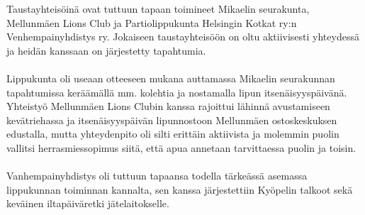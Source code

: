 \documentclass[a4paper, 12pt, finnish]{report} %
\begin{document}
Taustayhteisöinä ovat tuttuun tapaan toimineet Mikaelin seurakunta, Mellunmäen Lions Club ja Partiolippukunta Helsingin Kotkat ry:n Venhempainyhdistys ry. Jokaiseen taustayhteisöön on oltu aktiivisesti yhteydessä ja heidän kanssaan on järjestetty tapahtumia.\\
\\Lippukunta oli useaan otteeseen mukana auttamassa Mikaelin seurakunnan tapahtumissa keräämällä mm. kolehtia ja nostamalla lipun itsenäisyyspäivänä. Yhteistyö Mellunmäen Lions Clubin kanssa rajoittui lähinnä avustamiseen kevätriehassa ja itsenäisyyspäivän lipunnostoon Mellunmäen ostoskeskuksen edustalla, mutta yhteydenpito oli silti erittäin aktiivista ja molemmin puolin vallitsi herrasmiessopimus siitä, että apua annetaan tarvittaessa puolin ja toisin.\\
\\Vanhempainyhdistys oli tuttuun tapaansa todella tärkeässä asemassa lippukunnan toiminnan kannalta, sen kanssa järjestettiin Kyöpelin talkoot sekä keväinen iltapäiväretki jätelaitokselle. 
\end{document}
